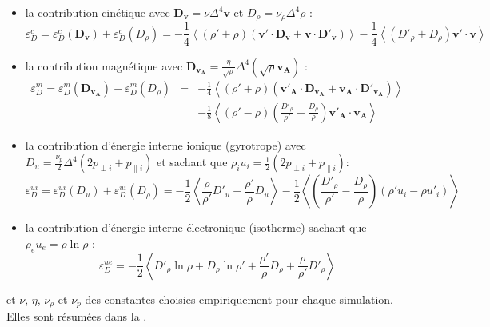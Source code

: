   \begin{itemize}
      \item la contribution cinétique avec $\boldsymbol{D}_{\boldsymbol{v}} = \nu \Delta^4 \boldsymbol{v} $ et $D_{\rho} = \nu_{\rho} \Delta^4 \rho $ :
      \begin{equation}
          \varepsilon^{c}_{D} = \varepsilon^{c}_{D}(\boldsymbol{D_{v}}) + \varepsilon^{c}_{D}(D_{\rho})=   - \frac{1}{4} \left< \left(\rho'+\rho\right) \left(\boldsymbol{v'} \cdot  \boldsymbol{D_{\boldsymbol{v}}} + \boldsymbol{v} \cdot   \boldsymbol{D'_{\boldsymbol{v}}}  \right)\right>   - \frac{1}{4} \left<  \left(D'_{\rho}+D_{\rho}\right)  \boldsymbol{v'} \cdot  \boldsymbol{v}\right> 
      \end{equation}
      \item la contribution magnétique avec $\boldsymbol{D_{v_A}} = \frac{\eta}{\sqrt{\rho}} \Delta^4 (\sqrt{\rho} \boldsymbol{v_A})$ :
      \begin{eqnarray}
          \varepsilon^{m}_{D} = \varepsilon^{m}_{D}(\boldsymbol{D_{v_A}}) + \varepsilon^{m}_{D}(D_{\rho})&=& - \frac{1}{4} \left< \left(\rho'+\rho\right) \left(\boldsymbol{v'_A} \cdot  \boldsymbol{D_{v_A}} + \boldsymbol{v_A} \cdot   \boldsymbol{D'_{v_A}}  \right) \right>\nonumber \\
          &&- \frac{1}{8} \left<\left(\rho'-\rho\right) \left(\frac{D'_{\rho}}{\rho'}-\frac{D_{\rho}}{\rho}\right) \boldsymbol{v'_A} \cdot  \boldsymbol{v_A} \right>
      \end{eqnarray}  
      \item la contribution d'énergie interne ionique (gyrotrope) avec $D_u =  \frac{\nu_p}{2} \Delta^4 (2p_{\perp i } + p_{\parallel i })$ et sachant que $ \rho_i u_i = \frac{1}{2} (2 p_{\perp i } + p_{\parallel i })$:
      \begin{equation}
          \varepsilon^{ui}_{D} = \varepsilon^{ui}_{D}(D_u) + \varepsilon^{ui}_{D}(D_{\rho})=   - \frac{1}{2} \left<  \frac{\rho}{\rho'} D'_u +  \frac{\rho'}{\rho} D_u \right>- \frac{1}{2} \left< \left(\frac{ D'_{\rho}}{\rho'} - \frac{D_{\rho}}{\rho} \right)\left( \rho' u_i  -  \rho u'_i \right)   \right>  
      \end{equation}
      \item la contribution d'énergie interne électronique (isotherme) sachant que  $\rho_e u_e = \rho \ln \rho$ :
      \begin{equation}
          \varepsilon^{ue}_{D} =   - \frac{1}{2} \left<  D'_{\rho} \ln \rho +  D_{\rho} \ln \rho' +  \frac{\rho'}{\rho} D_{\rho} + \frac{\rho}{\rho'} D'_{\rho} \right>  
      \end{equation}
  \end{itemize}
 et $\nu$, $\eta$, $\nu_{\rho}$ et $\nu_p$ des constantes choisies empiriquement pour chaque simulation. Elles sont résumées dans la .
 
